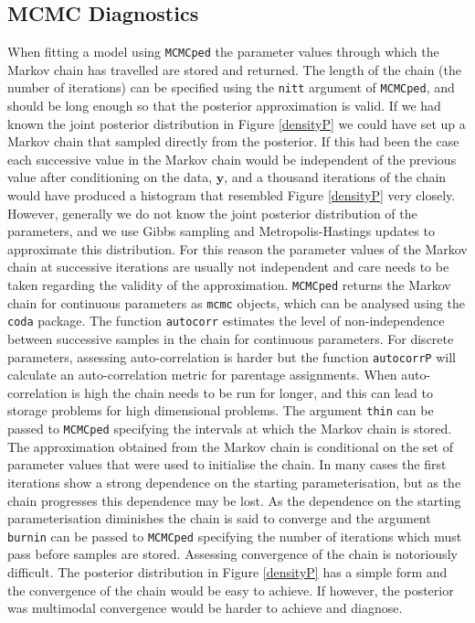 \documentclass{article}
\begin{document}
\subsection{MCMC Diagnostics}
\label{MCMC.D-sec}

When fitting a model using \texttt{MCMCped} the parameter values through which the Markov chain has travelled are stored and returned.  The length of the chain (the number of iterations) can be specified using the \texttt{nitt} argument of \texttt{MCMCped}, and should be long enough so that the posterior approximation is valid.  If we had known the joint posterior distribution in Figure \ref{densityP} we could have set up a Markov chain that sampled directly from the posterior.  If this had been the case each successive value in the Markov chain would be independent of the previous value after conditioning on the data, ${\bm y}$, and a thousand iterations of the chain would have produced a histogram that resembled Figure \ref{densityP} very closely.  However, generally we do not know the joint posterior distribution of the parameters, and we use Gibbs sampling and Metropolis-Hastings updates to approximate this distribution. For this reason the parameter values of the Markov chain at successive iterations are usually not independent and care needs to be taken regarding the validity of the approximation.  \texttt{MCMCped} returns the Markov chain for continuous parameters as \texttt{mcmc} objects, which can be analysed using the \texttt{coda} package.  The function \texttt{autocorr} estimates the level of non-independence between successive samples in the chain for continuous parameters. For discrete parameters, assessing auto-correlation is harder but the function \texttt{autocorrP} will calculate an auto-correlation metric for parentage assignments.  When auto-correlation is high the chain needs to be run for longer, and this can lead to storage problems for high dimensional problems. The argument \texttt{thin} can be passed to \texttt{MCMCped} specifying the intervals at which the Markov chain is stored.\\

The approximation obtained from the Markov chain is conditional on the set of parameter values that were used to initialise the chain.  In many cases the first iterations show a strong dependence on the starting parameterisation, but as the chain progresses this dependence may be lost.  As the dependence on the starting parameterisation diminishes the chain is said to converge and the argument \texttt{burnin} can be passed to \texttt{MCMCped} specifying the number of iterations which must pass before samples are stored.  Assessing convergence of the chain is notoriously difficult.  The posterior distribution in Figure \ref{densityP} has a simple form and the convergence of the chain would be easy to achieve.  If however, the posterior was multimodal convergence would be harder to achieve and diagnose.\\  
 
\end{document}
